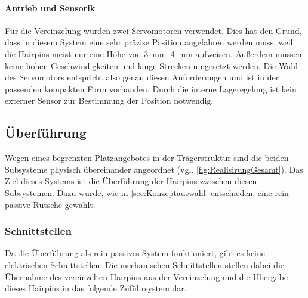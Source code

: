 \paragraph{Antrieb und Sensorik}
Für die Vereinzelung wurden zwei Servomotoren verwendet. Dies hat den Grund, dass in diesem System eine sehr präzise Position angefahren
werden muss, weil die Hairpins meist nur eine Höhe von \qtyrange{3}{4}{\milli\meter} aufweisen. Außerdem müssen keine hohen Geschwindigkeiten und lange Strecken
umgesetzt werden. Die Wahl des Servomotors entspricht also genau diesen Anforderungen und ist in der passenden kompakten Form vorhanden.
Durch die interne Lageregelung ist kein externer Sensor zur Bestimmung der Position notwendig.

\subsection{Überführung}\label{sec:Ueberfuehrung}
Wegen eines begrenzten Platzangebotes in der Trägerstruktur sind die beiden Subsysteme physisch übereinander angeordnet (vgl. \cref{fig:RealisirungGesamt}).
Das Ziel dieses Systems ist die Überführung der Hairpins zwischen diesen Subsystemen. Dazu wurde, wie in \cref{sec:Konzeptauswahl} entschieden,
eine rein passive Rutsche gewählt.

\subsubsection{Schnittstellen}
Da die Überführung als rein passives System funktioniert, gibt es keine elektrischen Schnittstellen. Die mechanischen Schnittstellen
stellen dabei die Übernahme des vereinzelten Hairpins aus der Vereinzelung und die Übergabe dieses Hairpins in das folgende Zuführsystem
dar.

